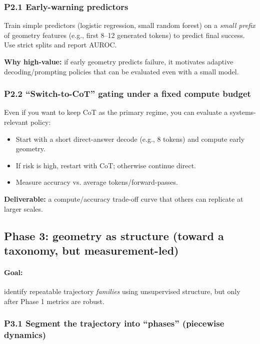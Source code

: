 \subsubsection{P2.1 Early-warning predictors}

Train simple predictors (logistic regression, small random forest) on a \emph{small prefix} of geometry features (e.g., first 8--12 generated tokens) to predict final success. Use strict splits and report AUROC.

\textbf{Why high-value:} if early geometry predicts failure, it motivates adaptive decoding/prompting policies that can be evaluated even with a small model.

\subsubsection{P2.2 ``Switch-to-CoT'' gating under a fixed compute budget}

Even if you want to keep CoT as the primary regime, you can evaluate a systems-relevant policy:
\begin{itemize}[leftmargin=*]
\item Start with a short direct-answer decode (e.g., 8 tokens) and compute early geometry.
\item If risk is high, restart with CoT; otherwise continue direct.
\item Measure accuracy vs. average tokens/forward-passes.
\end{itemize}

\textbf{Deliverable:} a compute/accuracy trade-off curve that others can replicate at larger scales.

\subsection{Phase 3: geometry as structure (toward a taxonomy, but measurement-led)}

\paragraph{Goal:} identify repeatable trajectory \emph{families} using unsupervised structure, but only after Phase 1 metrics are robust.

\subsubsection{P3.1 Segment the trajectory into ``phases'' (piecewise dynamics)}

